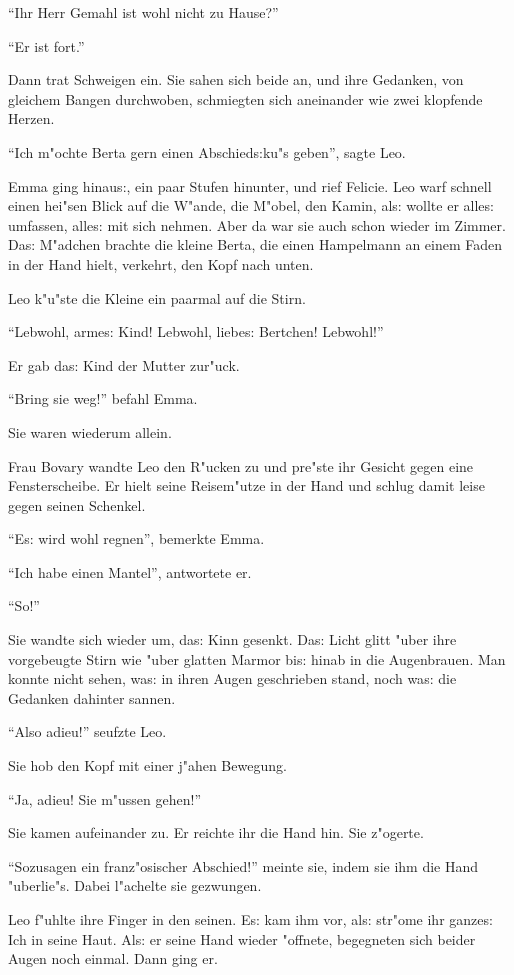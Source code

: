 \documentclass[oneside,12pt]{book}
\newcommand{\s}{s:}%
\begin{document}
"`Ihr Herr Gemahl ist wohl nicht zu Hause?"'

"`Er ist fort."'

Dann trat Schweigen ein. Sie sahen sich beide an, und ihre
Gedanken, von gleichem Bangen durchwoben, schmiegten sich
aneinander wie zwei klopfende Herzen.

"`Ich m"ochte Berta gern einen Abschied{\s}ku"s geben"', sagte
Leo.

Emma ging hinau{\s}, ein paar Stufen hinunter, und rief Felicie.
Leo warf schnell einen hei"sen Blick auf die W"ande, die M"obel,
den Kamin, al{\s} wollte er alle{\s} umfassen, alle{\s} mit sich
nehmen. Aber da war sie auch schon wieder im Zimmer. Da{\s}
M"adchen brachte die kleine Berta, die einen Hampelmann an einem
Faden in der Hand hielt, verkehrt, den Kopf nach unten.

Leo k"u"ste die Kleine ein paarmal auf die Stirn.

"`Lebwohl, arme{\s} Kind! Lebwohl, liebe{\s} Bertchen! Lebwohl!"'

Er gab da{\s} Kind der Mutter zur"uck.

"`Bring sie weg!"' befahl Emma.

Sie waren wiederum allein.

Frau Bovary wandte Leo den R"ucken zu und pre"ste ihr Gesicht
gegen eine Fensterscheibe. Er hielt seine Reisem"utze in der Hand
und schlug damit leise gegen seinen Schenkel.

"`E{\s} wird wohl regnen"', bemerkte Emma.

"`Ich habe einen Mantel"', antwortete er.

"`So!"'

Sie wandte sich wieder um, da{\s} Kinn gesenkt. Da{\s} Licht glitt
"uber ihre vorgebeugte Stirn wie "uber glatten Marmor bi{\s} hinab
in die Augenbrauen. Man konnte nicht sehen, wa{\s} in ihren Augen
geschrieben stand, noch wa{\s} die Gedanken dahinter sannen.

"`Also adieu!"' seufzte Leo.

Sie hob den Kopf mit einer j"ahen Bewegung.

"`Ja, adieu! Sie m"ussen gehen!"'

Sie kamen aufeinander zu. Er reichte ihr die Hand hin. Sie
z"ogerte.

"`Sozusagen ein franz"osischer Abschied!"' meinte sie, indem sie
ihm die Hand "uberlie"s. Dabei l"achelte sie gezwungen.

Leo f"uhlte ihre Finger in den seinen. E{\s} kam ihm vor, al{\s}
str"ome ihr ganze{\s} Ich in seine Haut. Al{\s} er seine Hand
wieder "offnete, begegneten sich beider Augen noch einmal. Dann
ging er.
\end{document}
